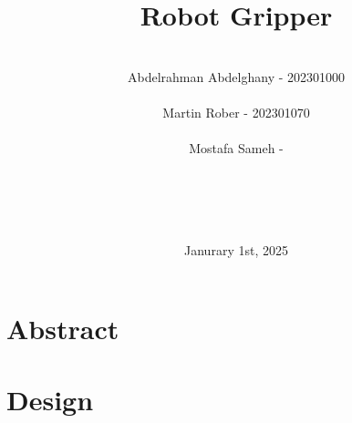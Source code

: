 \documentclass{article}
\title{Robot Gripper}
\author{ \\ Abdelrahman Abdelghany - 202301000 \\ \\ Martin Rober - 202301070 \\ \\ Mostafa Sameh - \\ \\ \\ \\ \\  }
\date{Janurary 1st, 2025}
\begin{document}
\maketitle

\newpage
\section*{Abstract}


\newpage
\section*{Design}

\newpage
\end{document}
